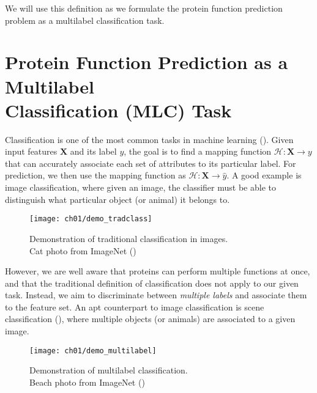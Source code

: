 \par We will use this definition as we formulate the protein function
prediction problem as a multilabel classification task.


\section[Protein Function Prediction as a Multilabel Classification Task]
{Protein Function Prediction as a Multilabel\\Classification  (MLC) Task}
\label{MultilabelClassification}

\par Classification is one of the most common tasks in machine learning
(\cite{herrera2016multilabel}). Given input features $\mathbf{X}$ and its
label $y$, the goal is to find a mapping function $\mathcal{H}: \mathbf{X}
\rightarrow y$ that can accurately associate each set of attributes to its
particular label. For prediction, we then use the mapping function as
$\mathcal{H}: \mathbf{X} \rightarrow \widehat{y}$. A good example is image
classification, where given an image, the classifier must be able to
distinguish what particular object (or animal) it belongs to.

\begin{figure}[!h]
  \centering
  \texttt{[image: ch01/demo\_tradclass]}
  \caption[Demonstration of traditional classification in images]
  {Demonstration of traditional classification in images.\\Cat photo
  from ImageNet (\cite{russakovsky2015imagenet})}
  \label{demo:traditional}
\end{figure}

\par However, we are well aware that proteins can perform multiple functions
at once, and that the traditional definition of classification does not apply
to our given task. Instead, we aim to discriminate between \textit{multiple
labels} and associate them to the feature set. An apt counterpart to image
classification is scene classification (\cite{boutell2004learning}), where
multiple objects (or animals) are associated to a given image.

\begin{figure}[!h]
  \centering
  \texttt{[image: ch01/demo\_multilabel]}
  \caption[Demonstration of multilabel classification]
  {Demonstration of multilabel classification.\\Beach photo
  from ImageNet (\cite{russakovsky2015imagenet})}
  \label{demo:multilabel}
\end{figure}

